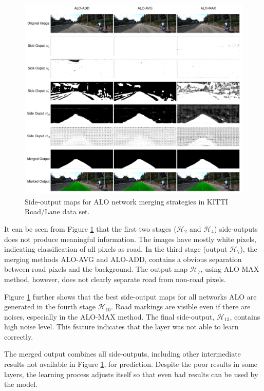 \begin{figure}
  \centering
  \includegraphics[width=1\columnwidth]{../imagens/ilustracoes/cap6_kitti_side_outputs.png}
  \caption{Side-output maps for ALO network merging strategies in KITTI Road/Lane data set.}
  \label{fig:kitti_side_outputs}
\end{figure}

It can be seen from Figure \ref{fig:kitti_side_outputs} that the first two stages ($\mathcal{H}_2$ and $\mathcal{H}_4$) side-outputs does not produce meaningful information.
The images have mostly white pixels, indicating classification of all pixels as road.
In the third stage (output $\mathcal{H}_7$), the merging methods ALO-AVG and ALO-ADD, contains a obvious separation between road pixels and the background.
The output map $\mathcal{H}_7$, using ALO-MAX method, however, does not clearly separate road from non-road pixels.

Figure \ref{fig:kitti_side_outputs} further shows that the best side-output maps for all networks ALO are generated in the fourth stage $\mathcal{H}_{10}$. 
Road markings are visible even if there are noises, especially in the ALO-MAX method.
The final side-output, $\mathcal{H}_{13}$, contains high noise level.
This feature indicates that the layer was not able to learn correctly.

The merged output combines all side-outputs, including other intermediate results not available in Figure \ref{fig:kitti_side_outputs}, for prediction.
Despite the poor results in some layers, the learning process adjusts itself so that even bad results can be used by the model.

